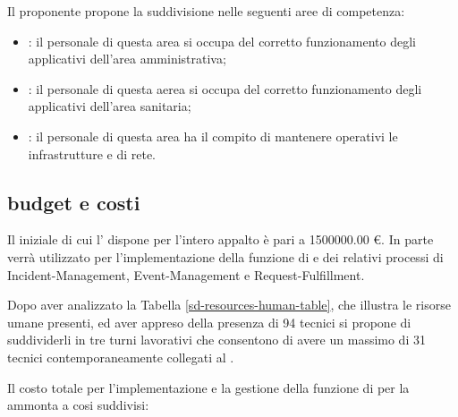 Il proponente propone la suddivisione nelle seguenti aree di competenza:

\begin{itemize}
\item{: il personale di questa area si occupa del corretto funzionamento degli applicativi dell'area amministrativa;}
\item{: il personale di questa aerea si occupa del corretto funzionamento degli applicativi dell'area sanitaria;}
\item{: il personale di questa area ha il compito di mantenere operativi le infrastrutture  e di rete.}
\end{itemize}

\subsection[Budget e costi]{budget e costi}
\label{sd-resources-budget}
Il  iniziale di cui l'\entity{} dispone per l'intero appalto è pari a \num{1500000.00} \euro{}. In parte verrà utilizzato per l'implementazione della funzione di  e dei relativi processi di \acf{Incident-Management}, \acf{Event-Management} e \acf{Request-Fulfillment}.

Dopo aver analizzato la Tabella \ref{sd-resources-human-table}, che illustra le risorse umane presenti, ed aver appreso della presenza di \num{94} tecnici si propone di suddividerli in tre turni lavorativi che consentono di avere un massimo di \num{31} tecnici contemporaneamente collegati al .

Il costo totale per l'implementazione e la gestione della funzione di  per la  ammonta a \keyword{229600.00 \euro{}} cosi suddivisi:

